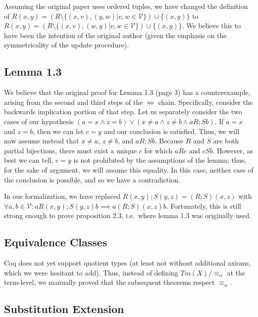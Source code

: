 \documentclass{article}
\begin{document}
Assuming the original paper uses ordered tuples, we have changed the definition of $R(x,y) = (R
\setminus \{ (x,v),(y,w) | v,w \in \mathcal{V} \}) \cup \{ (x,y) \}$ to $R(x,y) = (R \setminus \{
(x,v),(w,y) | v,w \in \mathcal{V} \}) \cup \{ (x,y) \}$. We believe this to have been the intention
of the original author (given the emphasis on the symmetricality of the update procedure).

\subsection{Lemma 1.3}

We believe that the original proof for Lemma 1.3 (page 3) has a counterexample, arising from the second
and third steps of the $\iff$ chain. Specifically, consider the backwards implication portion of
that step. Let us separately consider the two cases of our hypothesis $(a = x \land z = b) \lor (x
\neq a \land z \neq b \land a R; S b)$. If $a = x$ and $z = b$, then we can let $c = y$ and our
conclusion is satisfied. Thus, we will now assume instead that $x \neq a$, $z \neq b$, and $a R; S b$.
Because $R$ and $S$ are both partial bijections, there must exist a unique $c$ for which $aRc$ and
$cSb$. However, as best we can tell, $c = y$ is not prohibited by the assumptions of the lemma;
thus, for the sake of argument, we will assume this equality. In this case, neither case of the
conclusion is possible, and so we have a contradiction.

In our formalization, we have replaced $R(x,y); S(y,z) = (R;S)(x,z)$ with $\forall a, b \in
\mathcal{V} : a R(x,y); S(y,z) b \implies a (R;S)(x,z) b$. Fortunately, this is still strong enough to
prove proposition 2.3, i.e.\ where lemma 1.3 was originally used.

\subsection{Equivalence Classes}

Coq does not yet support quotient types (at least not without additional axioms, which we were
hesitant to add). Thus, instead of defining $Tm(X)/\equiv_\alpha$ at the term-level, we manually
proved that the subsequent theorems respect $\equiv_\alpha$.

\subsection{Substitution Extension}
\end{document}
